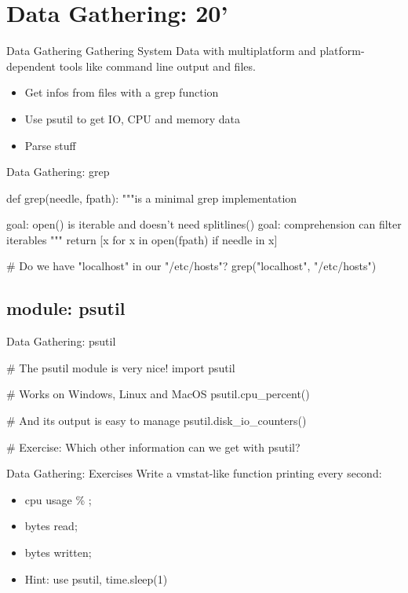 \section{Data Gathering: 20'}
%
%


\begin{frame}{Data Gathering}
    Gathering System Data with multiplatform
     and platform-dependent tools like command
     line output and files.

\begin{itemize}
\item Get infos from files with a grep function
\item Use psutil to get IO, CPU and memory data
\item Parse stuff
\end{itemize}

\end{frame}


\begin{frame}[fragile]{Data Gathering: grep}
\begin{pythoncode}
def grep(needle, fpath):
    """is a minimal grep implementation

       goal: open() is iterable and doesn't
             need splitlines()
       goal: comprehension can filter iterables
    """
    return [x for x in open(fpath) if needle in x]
    
# Do we have "localhost" in our "/etc/hosts"?
grep("localhost", "/etc/hosts")
\end{pythoncode}
\end{frame}

\subsection{module: psutil}
\begin{frame}[fragile]{Data Gathering: psutil}
\begin{pythoncode}
# The psutil module is very nice!
import psutil

# Works on Windows, Linux and MacOS
psutil.cpu_percent()

# And its output is easy to manage
psutil.disk_io_counters()

# Exercise: Which other information can we get with psutil?
\end{pythoncode}
\end{frame}


\begin{frame}[fragile]{Data Gathering: Exercises}
Write a vmstat-like function printing every second:
\begin{itemize}
\item cpu usage \% ;
\item bytes read;
\item bytes written;
\item Hint: use psutil, time.sleep(1)
\end{itemize}
\end{frame}

